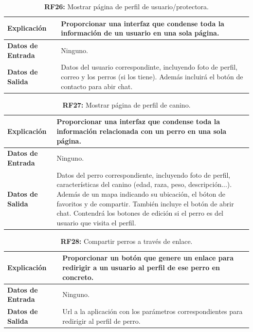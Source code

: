 \documentclass[a4paper, 12pt]{article}
\begin{document}
\begin{table}[H]
\captionsetup{justification=raggedright,singlelinecheck=false}
\caption{\textbf{RF26:} Mostrar página de perfil de usuario/protectora.}
\label{tab:RF26}
	\begin{tabular}{|m{5cm}|m{10cm}|}
	\hline
	\textbf{Explicación} & Proporcionar una interfaz que condense toda la información de un usuario en una sola página. \\ 
	\hline
	\textbf{Datos de Entrada} & Ninguno. \\ 
	\hline
	\textbf{Datos de Salida} & Datos del usuario correspondinte, incluyendo foto de perfil, correo y los perros (si los tiene). Además incluirá el botón de contacto para abir chat. \\ 
	\hline
\end{tabular}
\end{table}

\begin{table}[H]
\captionsetup{justification=raggedright,singlelinecheck=false}
\caption{\textbf{RF27:} Mostrar página de perfil de canino.}
\label{tab:RF27}
	\begin{tabular}{|m{5cm}|m{10cm}|}
	\hline
	\textbf{Explicación} & Proporcionar una interfaz que condense toda la información relacionada con un perro en una sola página. \\ 
	\hline
	\textbf{Datos de Entrada} & Ninguno. \\ 
	\hline
	\textbf{Datos de Salida} & Datos del perro correspondiente, incluyendo foto de perfil, características del canino (edad, raza, peso, descripción...). Además de un mapa indicando su ubicación, el bóton de favoritos y de compartir. También incluye el botón de abrir chat. Contendrá los botones de edición si el perro es del usuario que visita el perfil. \\ 
	\hline
\end{tabular}
\end{table}

\begin{table}[H]
\captionsetup{justification=raggedright,singlelinecheck=false}
\caption{\textbf{RF28:} Compartir perros a través de enlace.}
\label{tab:RF28}
	\begin{tabular}{|m{5cm}|m{10cm}|}
	\hline
	\textbf{Explicación} & Proporcionar un botón que genere un enlace para redirigir a un usuario al perfil de ese perro en concreto. \\ 
	\hline
	\textbf{Datos de Entrada} & Ninguno. \\ 
	\hline
	\textbf{Datos de Salida} & Url a la aplicación con los parámetros correspondientes para redirigir al perfil de perro. \\ 
	\hline
\end{tabular}
\end{table}
\end{document}
